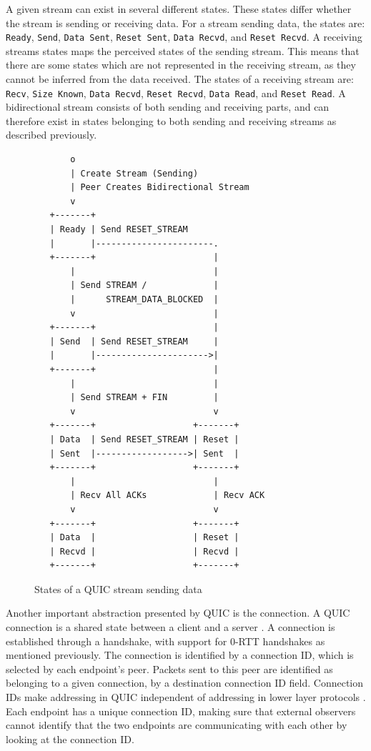 A given stream can exist in several different states.
These states differ whether the stream is sending or receiving
data. For a stream sending data, the states are:
\texttt{Ready}, \texttt{Send}, \texttt{Data Sent}, \texttt{Reset Sent},
\texttt{Data Recvd}, and \texttt{Reset Recvd}.
A receiving streams states maps the perceived states of the
sending stream. This means that there are some states
which are not represented in the receiving stream, as they
cannot be inferred from the data received. The states of a
receiving stream are: 
\texttt{Recv}, \texttt{Size Known}, \texttt{Data Recvd}, \texttt{Reset Recvd},
\texttt{Data Read}, and \texttt{Reset Read}.
A bidirectional stream consists of both sending and receiving parts,
and can therefore exist in states belonging to both sending and
receiving streams as described previously.

\begin{figure}[H]
    \centering
    \begin{lstlisting}
       o
       | Create Stream (Sending)
       | Peer Creates Bidirectional Stream
       v
   +-------+
   | Ready | Send RESET_STREAM
   |       |-----------------------.
   +-------+                       |
       |                           |
       | Send STREAM /             |
       |      STREAM_DATA_BLOCKED  |
       v                           |
   +-------+                       |
   | Send  | Send RESET_STREAM     |
   |       |---------------------->|
   +-------+                       |
       |                           |
       | Send STREAM + FIN         |
       v                           v
   +-------+                   +-------+
   | Data  | Send RESET_STREAM | Reset |
   | Sent  |------------------>| Sent  |
   +-------+                   +-------+
       |                           |
       | Recv All ACKs             | Recv ACK
       v                           v
   +-------+                   +-------+
   | Data  |                   | Reset |
   | Recvd |                   | Recvd |
   +-------+                   +-------+
    \end{lstlisting}
    \caption{States of a QUIC stream sending data \cite{iyengarQUICUDPBasedMultiplexed2021}}
    \label{fig:stream_states}
\end{figure}

Another important abstraction presented by QUIC is the connection.
A QUIC connection is a shared state between a client and a server 
\cite{iyengarQUICUDPBasedMultiplexed2021}.
A connection is established through a handshake, with support
for 0-RTT handshakes as mentioned previously. The connection
is identified by a connection ID, which is selected by each
endpoint's peer. Packets sent to this peer are identified as
belonging to a given connection, by a destination connection ID
field. Connection IDs make addressing in QUIC independent of addressing in lower layer
protocols \cite{iyengarQUICUDPBasedMultiplexed2021}. Each endpoint
has a unique connection ID, making sure that external observers cannot
identify that the two endpoints are communicating with each
other by looking at the connection ID.


